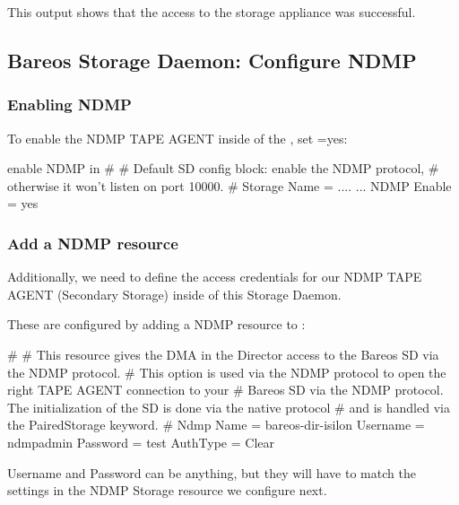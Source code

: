 This output shows that the access to the storage appliance was successful.



\subsection{Bareos Storage Daemon: Configure NDMP}

\label{sec:ndmp-sd-configure}

\subsubsection{Enabling NDMP}

To enable the NDMP TAPE AGENT inside of the \bareosSd,
set =yes:

\begin{bconfig}{enable NDMP in \bareosSd}
#
# Default SD config block: enable the NDMP protocol,
# otherwise it won't listen on port 10000.
#
Storage {
   Name = ....
   ...
   NDMP Enable = yes
}
\end{bconfig}

\subsubsection{Add a NDMP resource}


Additionally, we need to define the access credentials for our NDMP TAPE AGENT (Secondary Storage) inside of this Storage Daemon.

These are configured by adding a NDMP resource to :

\begin{bconfig}{}
#
# This resource gives the DMA in the Director access to the Bareos SD via the NDMP protocol.
# This option is used via the NDMP protocol to open the right TAPE AGENT connection to your
# Bareos SD via the NDMP protocol. The initialization of the SD is done via the native protocol
# and is handled via the PairedStorage keyword.
#
Ndmp {
  Name = bareos-dir-isilon
  Username = ndmpadmin
  Password = test
  AuthType = Clear
}
\end{bconfig}

Username and Password can be anything, but they will have to match the settings in the \bareosDir NDMP Storage resource we configure next.

